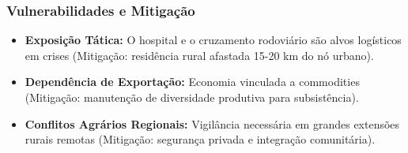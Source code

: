 \subsubsection{Vulnerabilidades e
Mitigação}

\begin{itemize}
\tightlist
\item
  \textbf{Exposição Tática:} O hospital e o cruzamento rodoviário são
  alvos logísticos em crises (Mitigação: residência rural afastada 15-20
  km do nó urbano).
\item
  \textbf{Dependência de Exportação:} Economia vinculada a commodities
  (Mitigação: manutenção de diversidade produtiva para subsistência).
\item
  \textbf{Conflitos Agrários Regionais:} Vigilância necessária em
  grandes extensões rurais remotas (Mitigação: segurança privada e
  integração comunitária).
\end{itemize}

